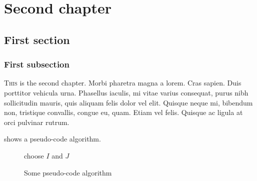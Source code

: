 \chapter{Second chapter}
\label{chap:second}

\section{First section}
\label{sec:chap-second-first}

\subsection{First subsection}
\label{subsec:chap-second-first}

\lettrine{T}{his} is the second chapter.
Morbi pharetra magna a lorem.
Cras sapien.
Duis porttitor vehicula urna.
Phasellus iaculis, mi vitae varius consequat, purus nibh sollicitudin mauris, quis aliquam felis dolor vel elit.
Quisque neque mi, bibendum non, tristique convallis, congue eu, quam.
Etiam vel felis.
Quisque ac ligula at orci pulvinar rutrum.

 shows a pseudo-code algorithm.
\begin{figure}[!ht]
  \begin{algorithm}[H] %
  
    choose \(I\) and \(J\)\;
  \end{algorithm}
  \caption{Some pseudo-code algorithm}
  \label{fig:chap-second-algorithm}
\end{figure}
 